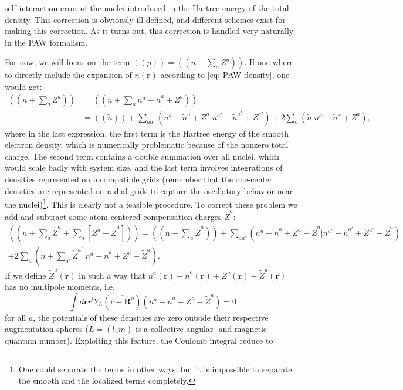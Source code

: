 \documentclass[a4paper]{article}
\newcommand{\s}[1]{\tilde{#1}}
\newcommand{\wh}[1]{\widehat{#1}}
\newcommand{\br}{\mathbf{r}}
\newcommand{\bR}{\mathbf{R}}
\begin{document}
self-interaction error of the nuclei introduced in the Hartree energy
of the total density. This correction is obviously ill defined, and
different schemes exist for making this correction. As it turns out,
this correction is handled very naturally in the PAW formalism.
\par For now, we will focus on the term $((\rho)) =
((n+\textstyle\sum_a Z^a))$. If one where to directly include the
expansion of $n(\br)$ according to \ref{eq: PAW density}, one would
get:
%
\begin{align*}
  ((n+\textstyle\sum_a Z^a)) &= ((\s{n}+\textstyle\sum_a n^a - \s{n}^a + Z^a)) \\&= ((\s{n})) + \sum_{aa'}(n^a - \s{n}^a + Z^a|n^{a'} - \s{n}^{a'} + Z^{a'}) + 2\sum_a(\s{n}|n^a - \s{n}^a + Z^a),
\end{align*}
%
where in the last expression, the first term is the Hartree energy of
the smooth electron density, which is numerically problematic because
of the nonzero total charge. The second term contains a double
summation over all nuclei, which would scale badly with system size,
and the last term involves integrations of densities represented on
incompatible grids (remember that the one-center densities are
represented on radial grids to capture the oscillatory behavior near
the nuclei)\footnote{One could separate the terms in other ways, but
  it is impossible to separate the smooth and the localized terms
  completely.}. This is clearly not a feasible procedure. To correct
these problem we add and subtract some atom centered compensation
charges $\s{Z}^a$:
%
\begin{multline*}
  ((n+\textstyle\sum_a \s{Z}^a + \textstyle\sum_a \left[Z^a - \s{Z}^a\right])) = ((\s{n} + \textstyle\sum_a \s{Z}^a)) + \sum_{aa'}(n^a - \s{n}^a + Z^a - \s{Z}^a|n^{a'} - \s{n}^{a'} + Z^{a'}- \s{Z}^a) \\+ 2\sum_a(\s{n}+\textstyle\sum_{a'}\s{Z}^{a'}|n^a - \s{n}^a + Z^a - \s{Z}^a).
\end{multline*}
%
If we define $\s{Z}^a(\br)$ in such a way that $n^a(\br) -
\s{n}^a(\br) + Z^a(\br) - \s{Z}^a(\br)$ has no multipole moments, i.e.
%
\begin{equation}\label{eq: no multipole}
  \int d\br r^l Y_L(\wh{\br-\bR^a}) (n^a - \s{n}^a + Z^a - \s{Z}^a) = 0
\end{equation}
%
for all $a$, the potentials of these densities are zero outside their
respective augmentation spheres ($L=(l,m)$ is a collective angular-
and magnetic quantum number). Exploiting this feature, the Coulomb
integral reduce to
\end{document}
